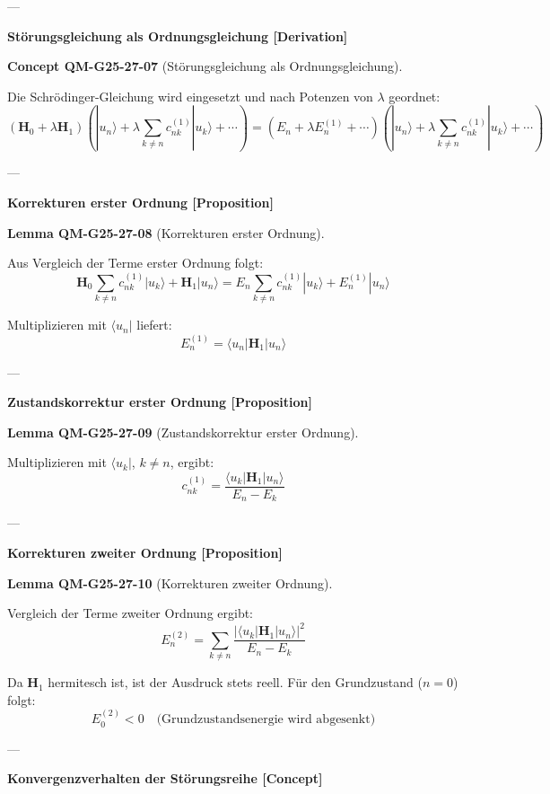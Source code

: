\documentclass[10pt, letterpaper]{article}
\newcommand{\CustomHeading}[3]{%
  \par\medskip\noindent%
  \textbf{#1 #2} \textnormal{(#3)}.\enskip%
}
\newenvironment{LEM}[2]{\begin{unitbox}\CustomHeading{Lemma}{#1}{#2}}{\end{unitbox}}
\newenvironment{CONC}[2]{\begin{unitbox}\CustomHeading{Concept}{#1}{#2}}{\end{unitbox}}
\begin{document}
---

\textbf{Störungsgleichung als Ordnungsgleichung [Derivation]}

\begin{CONC}{QM-G25-27-07}{Störungsgleichung als Ordnungsgleichung}
Die Schrödinger-Gleichung wird eingesetzt und nach Potenzen von $\lambda$ geordnet:
\[
(\mathbf{H}_0 + \lambda \mathbf{H}_1)\left(|u_n\rangle + \lambda \sum_{k\neq n} c_{nk}^{(1)} |u_k\rangle + \cdots\right)
= \left(E_n + \lambda E_n^{(1)} + \cdots\right)\left(|u_n\rangle + \lambda \sum_{k\neq n} c_{nk}^{(1)} |u_k\rangle + \cdots\right)
\]
\end{CONC}

---

\textbf{Korrekturen erster Ordnung [Proposition]}

\begin{LEM}{QM-G25-27-08}{Korrekturen erster Ordnung}
Aus Vergleich der Terme erster Ordnung folgt:
\[
\mathbf{H}_0 \sum_{k\neq n} c_{nk}^{(1)} |u_k\rangle + \mathbf{H}_1 |u_n\rangle = E_n \sum_{k\neq n} c_{nk}^{(1)} |u_k\rangle + E_n^{(1)} |u_n\rangle
\]

Multiplizieren mit $\langle u_n|$ liefert:
\[
E_n^{(1)} = \langle u_n | \mathbf{H}_1 | u_n \rangle
\]
\end{LEM}

---

\textbf{Zustandskorrektur erster Ordnung [Proposition]}

\begin{LEM}{QM-G25-27-09}{Zustandskorrektur erster Ordnung}
Multiplizieren mit $\langle u_k|$, $k \ne n$, ergibt:
\[
c_{nk}^{(1)} = \frac{\langle u_k | \mathbf{H}_1 | u_n \rangle}{E_n - E_k}
\]
\end{LEM}

---

\textbf{Korrekturen zweiter Ordnung [Proposition]}

\begin{LEM}{QM-G25-27-10}{Korrekturen zweiter Ordnung}
Vergleich der Terme zweiter Ordnung ergibt:
\[
E_n^{(2)} = \sum_{k\ne n} \frac{|\langle u_k | \mathbf{H}_1 | u_n \rangle|^2}{E_n - E_k}
\]

Da $\mathbf{H}_1$ hermitesch ist, ist der Ausdruck stets reell. Für den Grundzustand ($n=0$) folgt:
\[
E_0^{(2)} < 0 \quad \text{(Grundzustandsenergie wird abgesenkt)}
\]
\end{LEM}

---

\textbf{Konvergenzverhalten der Störungsreihe [Concept]}
\end{document}
